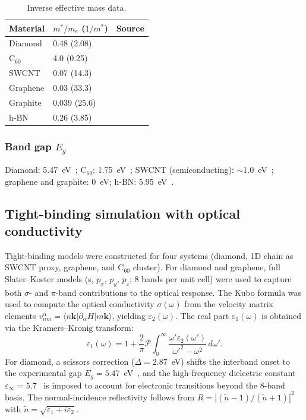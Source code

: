 \documentclass[twocolumn,showpacs,preprintnumbers,amsmath,amssymb,prb]{revtex4-2}
\begin{document}
\begin{table}[h]
\caption{Inverse effective mass data.}
\label{tab:invmass}
\begin{ruledtabular}
\begin{tabular}{lll}
  Material & $m^*/m_e$ ($1/m^*$) & Source \\
  \hline
  Diamond & 0.48 (2.08) & \cite{Ioffe} \\
  C$_{60}$ & 4.0 (0.25) & \cite{Gunnarsson1997} \\
  SWCNT & 0.07 (14.3) & \cite{Ajiki1993} \\
  Graphene & 0.03 (33.3) & \cite{Novoselov2005} \\
  Graphite & 0.039 (25.6) & \cite{Dresselhaus2002} \\
  h-BN & 0.26 (3.85) & \cite{Ioffe} \\
\end{tabular}
\end{ruledtabular}
\end{table}

\subsubsection{Band gap $E_g$}

Diamond: 5.47~eV~\cite{Clark1964}; C$_{60}$: 1.75~eV~\cite{Lof1992};
SWCNT (semiconducting): $\sim$1.0~eV~\cite{Saito1998};
graphene and graphite: 0~eV; h-BN: 5.95~eV~\cite{Cassabois2016}.

\subsection{Tight-binding simulation with optical conductivity}

Tight-binding models were constructed for four systems (diamond,
1D chain as SWCNT proxy, graphene, and C$_{60}$ cluster).
For diamond and graphene, full Slater--Koster models (s, $p_x$, $p_y$,
$p_z$; 8 bands per unit cell) were used to capture both $\sigma$- and
$\pi$-band contributions to the optical response.
The Kubo formula was used to compute the optical conductivity
$\sigma(\omega)$ from the velocity matrix elements
$v_{nm}^\alpha = \langle n\bm{k} | \partial_\alpha H | m\bm{k} \rangle$,
yielding $\varepsilon_2(\omega)$.
The real part $\varepsilon_1(\omega)$ is obtained via the
Kramers--Kronig transform:
\begin{equation}
  \varepsilon_1(\omega) = 1 + \frac{2}{\pi} \mathcal{P}
  \int_0^\infty \frac{\omega'\varepsilon_2(\omega')}
  {\omega'^2 - \omega^2}\, d\omega'.
  \label{eq:KK}
\end{equation}
For diamond, a scissors correction ($\Delta = 2.87$~eV)
shifts the interband onset to the experimental gap
$E_g = 5.47$~eV~\cite{Clark1964},
and the high-frequency dielectric constant
$\varepsilon_\infty = 5.7$~\cite{Palik1998} is imposed to account for
electronic transitions beyond the 8-band basis.
The normal-incidence reflectivity follows from
$R = |(\tilde{n}-1)/(\tilde{n}+1)|^2$ with
$\tilde{n} = \sqrt{\varepsilon_1 + i\varepsilon_2}$.
\end{document}
